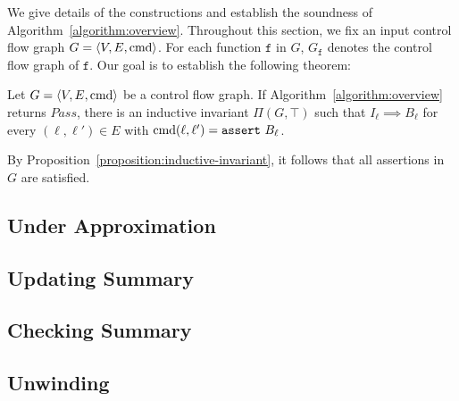 
We give details of the constructions and establish the soundness of
Algorithm~\ref{algorithm:overview}. Throughout this section, we fix an
input control flow graph $G = \langle V, E, \textmd{cmd} \rangle$. For
each function $\mathtt{f}$ in $G$, $G_{\mathtt{f}}$ denotes the
control flow graph of $\mathtt{f}$. Our goal is to establish the
following theorem:

\begin{theorem}
  Let $G = \langle V, E, \textmd{cmd} \rangle$ be a control flow
  graph. If Algorithm~\ref{algorithm:overview} returns
  $\mathit{Pass}$, there is an inductive invariant $\Pi (G, \top)$
  such that $I_{\ell} \implies B_{\ell}$ for every $(\ell, \ell') \in
  E$ with $\textmd{cmd} (\ell, \ell') = \mathtt{assert\ } B_{\ell}$.
  \label{theorem:soundness}
\end{theorem}

By Proposition~\ref{proposition:inductive-invariant}, it follows that
all assertions in $G$ are satisfied.

\subsection{Under Approximation}
\label{subsection:under-approximation}

\subsection{Updating Summary}
\label{subsection:updating-summary}

\subsection{Checking Summary}
\label{subsection:checking-summary}

\subsection{Unwinding}
\label{subsection:unwinding}

